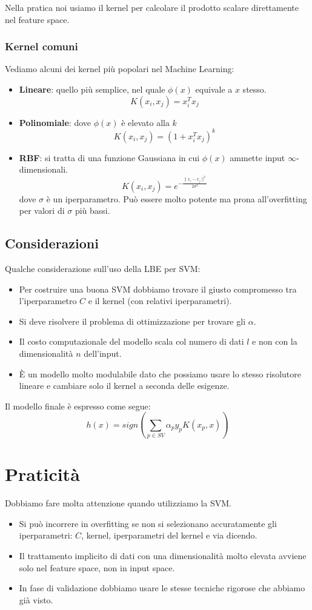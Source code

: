 Nella pratica noi usiamo il kernel per calcolare il prodotto scalare direttamente nel feature space.

\subsubsection{Kernel comuni}
Vediamo alcuni dei kernel pi\`u popolari nel Machine Learning:
\begin{itemize}
	\item \textbf{Lineare}: quello pi\`u semplice, nel quale $\phi(x)$ equivale a $x$ stesso.
	      \[ K(x_i, x_j) = x_i^T x_j \]
	\item \textbf{Polinomiale}: dove $\phi(x)$ \`e elevato alla $k$
	      \[ K(x_i, x_j) = (1 + x_i^T x_j)^k \]
	\item \textbf{RBF}: si tratta di una funzione Gaussiana in cui $\phi(x)$ ammette input $\infty$-dimensionali.
	      \[ K(x_i, x_j) = e^{-\displaystyle\frac{\| x_i - x_j \|^2}{2 \sigma^2}} \]
	      dove $\sigma$ \`e un iperparametro. Pu\`o essere molto potente ma prona all'overfitting per valori di
	      $\sigma$ pi\`u bassi.
\end{itemize}

\subsection{Considerazioni}
Qualche considerazione sull'uso della LBE per SVM:
\begin{itemize}
	\item Per costruire una buona SVM dobbiamo trovare il giusto compromesso tra l'iperparametro $C$ e il kernel (con
	      relativi iperparametri).
	\item Si deve risolvere il problema di ottimizzazione per trovare gli $\alpha$.
	\item Il costo computazionale del modello scala	col numero di dati $l$ e non con la dimensionalit\`a $n$ dell'input.
	\item \`E un modello molto modulabile dato che possiamo usare lo stesso risolutore lineare e cambiare solo il kernel
	      a seconda delle esigenze.
\end{itemize}

Il modello finale \`e espresso come segue:
\[ h(x) = sign \left( \sum_{p \in SV} \alpha_p y_p K(x_p, x) \right) \]

\section{Praticit\`a}
Dobbiamo fare molta attenzione quando utilizziamo la SVM.
\begin{itemize}
	\item Si pu\`o incorrere in overfitting se non si selezionano accuratamente gli iperparametri: $C$, kernel,
	      iperparametri del kernel e via dicendo.
	\item Il trattamento implicito di dati con una dimensionalit\`a molto elevata avviene solo nel feature space, non
	      in input space.
	\item In fase di validazione dobbiamo usare le stesse tecniche rigorose che abbiamo gi\`a visto.
\end{itemize}

